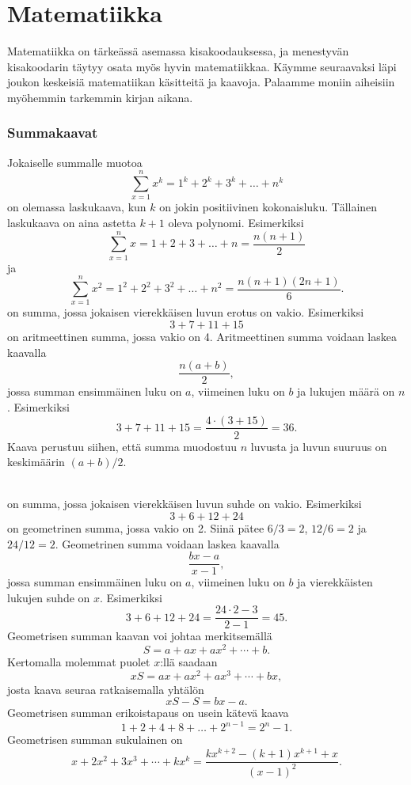 \section{Matematiikka}

Matematiikka on tärkeässä asemassa kisakoodauksessa,
ja menestyvän kisakoodarin täytyy osata myös
hyvin matematiikkaa.
Käymme seuraavaksi läpi joukon keskeisiä
matematiikan käsitteitä ja kaavoja.
Palaamme moniin aiheisiin myöhemmin tarkemmin kirjan aikana.

\subsubsection{Summakaavat}

Jokaiselle summalle muotoa
\[\sum_{x=1}^n x^k = 1^k+2^k+3^k+\ldots+n^k\]
on olemassa laskukaava,
kun $k$ on jokin positiivinen kokonaisluku.
Tällainen laskukaava on aina astetta $k+1$
oleva polynomi. Esimerkiksi
\[\sum_{x=1}^n x = 1+2+3+\ldots+n = \frac{n(n+1)}{2}\]
ja
\[\sum_{x=1}^n x^2 = 1^2+2^2+3^2+\ldots+n^2 = \frac{n(n+1)(2n+1)}{6}.\]
\noindent
{} on summa, 
jossa jokaisen vierekkäisen luvun erotus on vakio.
Esimerkiksi
\[3+7+11+15\]
on aritmeettinen summa,
jossa vakio on 4.
Aritmeettinen summa voidaan laskea kaavalla
\[\frac{n(a+b)}{2},\]
jossa summan ensimmäinen luku on $a$,
viimeinen luku on $b$ ja lukujen määrä on $n$.
Esimerkiksi
\[3+7+11+15=\frac{4 \cdot (3+15)}{2} = 36.\]
Kaava perustuu siihen, että summa muodostuu $n$ luvusta
ja luvun suuruus on keskimäärin $(a+b)/2$.

~\\
\noindent
{} on summa,
jossa jokaisen vierekkäisen luvun suhde on vakio.
Esimerkiksi
\[3+6+12+24\]
on geometrinen summa,
jossa vakio on 2.
Siinä pätee $6/3=2$, $12/6=2$ ja $24/12=2$.
Geometrinen summa voidaan laskea kaavalla
\[\frac{bx-a}{x-1},\]
jossa summan ensimmäinen luku on $a$,
viimeinen luku on $b$ ja vierekkäisten lukujen suhde on $x$.
Esimerkiksi
\[3+6+12+24=\frac{24 \cdot 2 - 3}{2-1} = 45.\]
Geometrisen summan kaavan voi johtaa merkitsemällä
\[ S = a + ax + ax^2 + \cdots + b .\] 
Kertomalla molemmat puolet $x$:llä saadaan
\[ xS = ax + ax^2 + ax^3 + \cdots + bx,\]
josta kaava seuraa ratkaisemalla yhtälön
\[ xS-S = bx-a.\]
Geometrisen summan erikoistapaus on usein kätevä kaava
\[1+2+4+8+\ldots+2^{n-1}=2^n-1.\]
Geometrisen summan sukulainen on
\[x+2x^2+3x^3+\cdots+k x^k = \frac{kx^{k+2}-(k+1)x^{k+1}+x}{(x-1)^2}. \]

